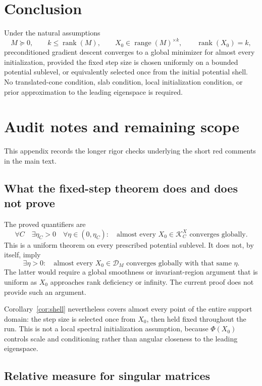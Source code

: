 \documentclass[11pt]{article}
\newcommand{\rank}{\operatorname{rank}}
\newcommand{\range}{\operatorname{range}}
\newcommand{\cD}{\mathcal{D}}
\newcommand{\cK}{\mathcal{K}}
\begin{document}
\section{Conclusion}

Under the natural assumptions
\[
M\succeq0,
\qquad
k\le\rank(M),
\qquad
X_0\in\range(M)^{\times k},
\qquad
\rank(X_0)=k,
\]
preconditioned gradient descent converges to a global minimizer for almost
every initialization, provided the fixed step size is chosen uniformly on a
bounded potential sublevel, or equivalently selected once from the initial
potential shell. No translated-cone condition, slab condition, local
initialization condition, or prior approximation to the leading eigenspace is
required.

\appendix

\section{Audit notes and remaining scope}
\label{app:audit}

This appendix records the longer rigor checks underlying the short red comments
in the main text.

\subsection{What the fixed-step theorem does and does not prove}

The proved quantifiers are
\[
\forall C\quad
\exists\eta_C>0\quad
\forall\eta\in(0,\eta_C):
\quad
\text{almost every }X_0\in\cK_C^X
\text{ converges globally}.
\]
This is a uniform theorem on every prescribed potential sublevel. It does not,
by itself, imply
\[
\exists\eta>0:
\quad
\text{almost every }X_0\in\cD_M
\text{ converges globally with that same }\eta.
\]
The latter would require a global smoothness or invariant-region argument that
is uniform as \(X_0\) approaches rank deficiency or infinity. The current
proof does not provide such an argument.

Corollary~\ref{cor:shell} nevertheless covers almost every point of the entire
support domain: the step size is selected once from \(X_0\), then held fixed
throughout the run. This is not a local spectral initialization assumption,
because \(\Phi(X_0)\) controls scale and conditioning rather than angular
closeness to the leading eigenspace.

\subsection{Relative measure for singular matrices}
\end{document}
